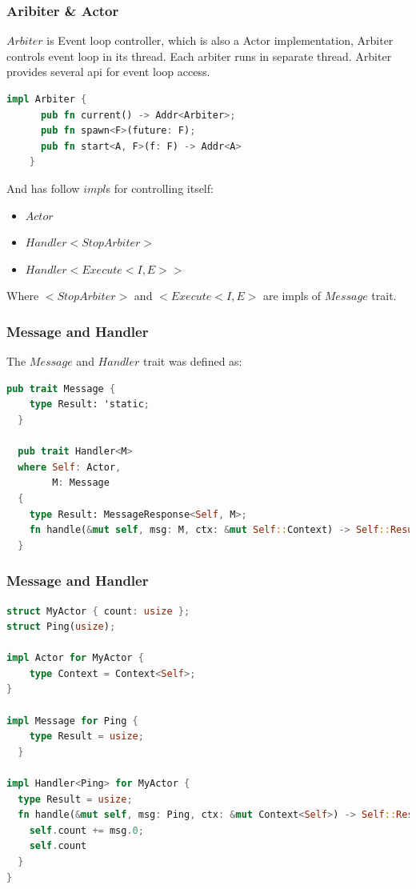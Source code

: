 \documentclass[notheorems, aspectratio=54]{beamer}
\begin{document}
\begin{frame}[fragile]
  \frametitle{Aribiter \& Actor}
  $Arbiter$ is Event loop controller, which is also a Actor implementation, Arbiter controls event loop in its thread. Each arbiter runs in separate thread. Arbiter provides several api for event loop access.

  \begin{lstlisting}[language=Rust]
    impl Arbiter {
      pub fn current() -> Addr<Arbiter>;
      pub fn spawn<F>(future: F);
      pub fn start<A, F>(f: F) -> Addr<A>
    }
  \end{lstlisting}
  And has follow $impl$s for controlling itself:
  \begin{itemize}
  \item $Actor$
  \item $Handler<StopArbiter>$
  \item $Handler<Execute<I, E>>$
  \end{itemize}
  Where $<StopArbiter>$ and $<Execute<I, E>$ are impls of $Message$ trait.
\end{frame}


\begin{frame}[fragile]
  \frametitle{Message and Handler}
  The $Message$ and $Handler$ trait was defined as:
  \begin{lstlisting}[language=Rust]
  pub trait Message {
    type Result: 'static;
  }

  pub trait Handler<M>
  where Self: Actor,
        M: Message
  {
    type Result: MessageResponse<Self, M>;
    fn handle(&mut self, msg: M, ctx: &mut Self::Context) -> Self::Result;
  }
  \end{lstlisting}
\end{frame}

\begin{frame}[fragile]

  \frametitle{Message and Handler}
  \begin{lstlisting}[language=Rust]
struct MyActor { count: usize };
struct Ping(usize);

impl Actor for MyActor {
    type Context = Context<Self>;
}

impl Message for Ping {
    type Result = usize;
  }

impl Handler<Ping> for MyActor {
  type Result = usize;
  fn handle(&mut self, msg: Ping, ctx: &mut Context<Self>) -> Self::Result {
    self.count += msg.0;
    self.count
  }
}
  \end{lstlisting}
\end{frame}
\end{document}
